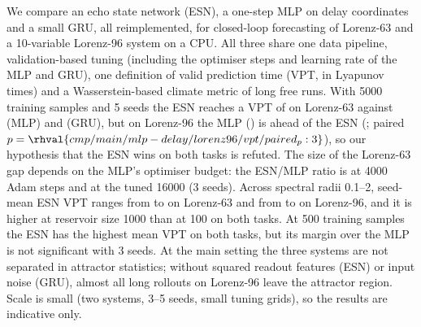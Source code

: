 We compare an echo state network (ESN), a one-step MLP on delay coordinates and a small GRU, all reimplemented, for closed-loop forecasting of Lorenz-63 and a 10-variable Lorenz-96 system on a CPU. All three share one data pipeline, validation-based tuning (including the optimiser steps and learning rate of the MLP and GRU), one definition of valid prediction time (VPT, in Lyapunov times) and a Wasserstein-based climate metric of long free runs. With 5000 training samples and 5 seeds the ESN reaches a VPT of  on Lorenz-63 against  (MLP) and  (GRU), but on Lorenz-96 the MLP () is ahead of the ESN (; paired $p=\rhval{cmp/main/mlp-delay/lorenz96/vpt/paired_p:3}$), so our hypothesis that the ESN wins on both tasks is refuted. The size of the Lorenz-63 gap depends on the MLP's optimiser budget: the ESN/MLP ratio is  at 4000 Adam steps and  at the tuned 16000 (3 seeds). Across spectral radii 0.1--2, seed-mean ESN VPT ranges from  to  on Lorenz-63 and from  to  on Lorenz-96, and it is higher at reservoir size 1000 than at 100 on both tasks. At 500 training samples the ESN has the highest mean VPT on both tasks, but its margin over the MLP is not significant with 3 seeds. At the main setting the three systems are not separated in attractor statistics; without squared readout features (ESN) or input noise (GRU), almost all long rollouts on Lorenz-96 leave the attractor region. Scale is small (two systems, 3--5 seeds, small tuning grids), so the results are indicative only.
